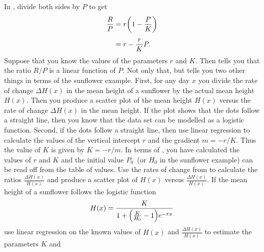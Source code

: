 \documentclass[a4paper,oneside,12pt]{article}
\begin{document}
\begin{problem}
\begin{packedenum}
  \item\label{subprob:logarithm:logistic_sunflower_rate_over_function_value}
    In , divide
    both sides by $P$ to get
    \begin{equation}
    \label{eqn:logarithm:logistic_differential_equation_linear_in_P}
    \begin{aligned}
    \frac{R}{P}
    &=
    r \parenthesis*{1 - \frac{P}{K}} \\[4pt]
    &=
    r - \frac{r}{K} P.
    \end{aligned}
    \end{equation}
    Suppose that you know the values of the parameters $r$ and $K$.
    Then
    tells you that the ratio $R / P$ is a linear function of $P$.  Not
    only that, but
    tells you two other things in terms of the sunflower example.
    First, for any day $x$ you divide the rate of change $\Delta H(x)$
    in the mean height of a sunflower by the actual mean height
    $H(x)$.  Then you produce a scatter plot of the mean height $H(x)$
    versus the rate of change $\Delta H(x)$ in the mean height.  If
    the plot shows that the dots follow a straight line, then you know
    that the data set can be modelled as a logistic function.  Second,
    if the dots follow a straight line, then use linear regression to
    calculate the values of the vertical intercept $r$ and the
    gradient $m = -r / K$.  Thus the value of $K$ is given by
    $K = -r / m$.  In terms of
    ,
    you have calculated the values of $r$ and $K$ and the initial
    value $P_0$~(or $H_0$ in the sunflower example) can be read off
    from the table of values.  Use the rates of change
    from  to
    calculate the ratios $\frac{\Delta H(x)}{H(x)}$ and produce a
    scatter plot of $H(x)$ versus $\frac{\Delta H(x)}{H(x)}$.  If the
    mean height of a sunflower follows the logistic function
    \begin{equation}
    \label{eqn:logarithm:logistic_sunflower_formula}
    H(x)
    =
    \frac{
      K
    }{
      1 + \parenthesis*{\frac{K}{H_0} - 1} e^{-rx}
    }
    \end{equation}
    use linear regression on the known values of $H(x)$ and
    $\frac{\Delta H(x)}{H(x)}$ to estimate the parameters $K$ and

\end{packedenum}
\end{problem}
\end{document}
